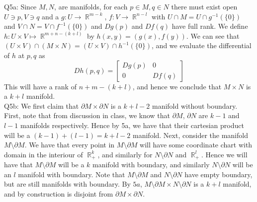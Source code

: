 \documentclass[letterpaper]{article}
\DeclareMathOperator{\R}{\mathbb{R}}
\newcommand{\bd}{\partial}
\begin{document}
\noindent Q5a: Since $M,N$, are manifolds, for each $p\in M,q\in N$ there must exist open $U\ni p, V\ni q$ and a $g:U\to \R^{m-k}$, $f: V\to \R^{n-l}$ with $U \cap M = U \cap g^{-1}(\{0\})$ and $V\cap N = V \cap f^{-1}(\{0\})$ and $Dg(p)$ and $Df(q)$ have full rank. We define $h:U\times V \mapsto \R^{m+n -(k+l)}$ by $h(x,y) = (g(x),f(y))$. We can see that $(U \times  V)\cap (M\times N) = (U\times V) \cap h^{-1}(\{0\})$, and we evaluate the differential of $h$ at $p,q$ as $$Dh(p,q) = \begin{bmatrix}Dg(p) & 0 \\ 0 & Df(q) \end{bmatrix}$$ This will have a rank of $n+m-(k+l)$, and hence we conclude that $M\times N$ is a $k+l$ manifold. 
\newline \\ Q5b: We first claim that $\bd M \times \bd N$ is a $k+l-2$ manifold without boundary. First, note that from discussion in class, we know that $\bd M$, $\bd N$ are $k-1$ and $l-1$ manifolds respectively. Hence by 5a, we have that their cartesian product will be a $(k-1)+(l-1) = k+l-2$ manifold. Next, consider the manifold $M\setminus \bd M$. We have that every point in $M \setminus \bd M$ will have some coordinate chart with domain in the interiour of $\R^{k}_{+}$, and similarly for $N \setminus \bd N$ and $\R^l_+$. Hence we will have that $M\setminus \bd M$ will be a $k$ manifold with boundary, and similarly $N \setminus \bd N$ will be an $l$ manifold with boundary. Note that $M \setminus \bd M$ and $N \setminus \bd N$ have empty boundary, but are still manifolds with boundary. By $5a$, $M \setminus \bd M \times N \setminus \bd N$ is a $k+l$ manifold, and by construction is disjoint from $\bd M \times \bd N$. 
\end{document}
